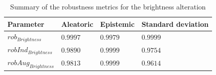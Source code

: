 \begin{table}[h]
	\centering
	\begin{tabular}{|| l | l | l | l ||} 
		\hline
		\textbf{Parameter} & \textbf{Aleatoric} & \textbf{Epistemic} & \textbf{Standard deviation} \\
		\hline
		\hline
		$rob_{Brightness}$ & $0.9997$ & $0.9979$ & $0.9999$ \\
		$robInd_{Brightness}$ & $0.9890$ & $0.9999$ & $0.9754$ \\
		$robAug_{Brightness}$ & $0.9813$ & $0.9999$ & $0.9614$ \\	
		\hline
	\end{tabular}	
	\caption{Summary of the robustness metrics for the brightness alteration}
	\label{table:rob_br}
\end{table}